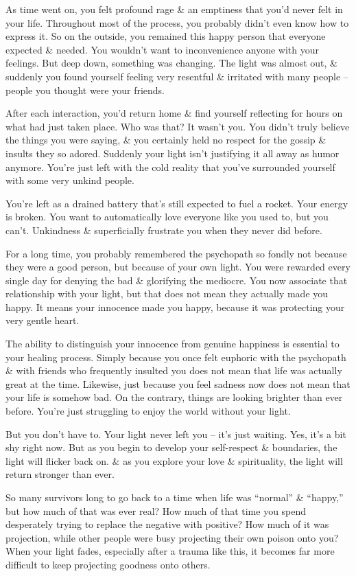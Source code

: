 \documentclass{article}
\numberwithin{equation}{section}
\begin{document}
As time went on, you felt profound rage \& an emptiness that you'd never felt in your life. Throughout most of the process, you probably didn't even know how to express it. So on the outside, you remained this happy person that everyone expected \& needed. You wouldn't want to inconvenience anyone with your feelings. But deep down, something was changing. The light was almost out, \& suddenly you found yourself feeling very resentful \& irritated with many people -- people you thought were your friends.

After each interaction, you'd return home \& find yourself reflecting for hours on what had just taken place. Who was that? It wasn't you. You didn't truly believe the things you were saying, \& you certainly held no respect for the gossip \& insults they so adored. Suddenly your light isn't justifying it all away as humor anymore. You're just left with the cold reality that you've surrounded yourself with some very unkind people.

You're left as a drained battery that's still expected to fuel a rocket. Your energy is broken. You want to automatically love everyone like you used to, but you can't. Unkindness \& superficially frustrate you when they never did before.

For a long time, you probably remembered the psychopath so fondly not because they were a good person, but because of your own light. You were rewarded every single day for denying the bad \& glorifying the mediocre. You now associate that relationship with your light, but that does not mean they actually made you happy. It means your innocence made you happy, because it was protecting your very gentle heart.

The ability to distinguish your innocence from genuine happiness is essential to your healing process. Simply because you once felt euphoric with the psychopath \& with friends who frequently insulted you does not mean that life was actually great at the time. Likewise, just because you feel sadness now does not mean that your life is somehow bad. On the contrary, things are looking brighter than ever before. You're just struggling to enjoy the world without your light.

But you don't have to. Your light never left you -- it's just waiting. Yes, it's a bit shy right now. But as you begin to develop your self-respect \& boundaries, the light will flicker back on. \& as you explore your love \& spirituality, the light will return stronger than ever.

So many survivors long to go back to a time when life was ``normal'' \& ``happy,'' but how much of that was ever real? How much of that time you spend desperately trying to replace the negative with positive? How much of it was projection, while other people were busy projecting their own poison onto you? When your light fades, especially after a trauma like this, it becomes far more difficult to keep projecting goodness onto others.
\end{document}
